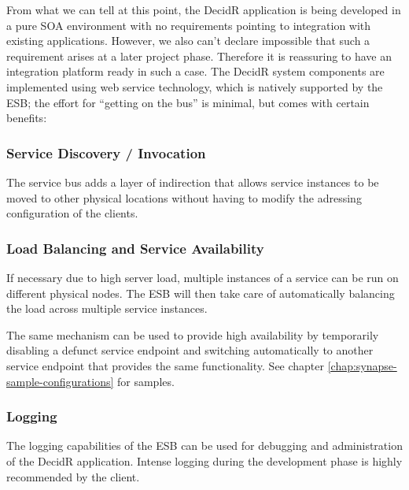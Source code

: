 From what we can tell at this point, the DecidR application is being developed
in a pure SOA environment with no requirements pointing to integration with
existing applications. However, we also can't declare impossible that such a
requirement arises at a later project phase. Therefore it is reassuring
to have an integration platform ready in such a case.
The DecidR system components are implemented using web service technology,
which is natively supported by the ESB; the effort for ``getting on the
bus'' is minimal, but comes with certain benefits:

\subsubsection{Service Discovery / Invocation}
\label{subsec:service-discovery-incovation}

The service bus adds a layer of indirection that allows service instances to be
moved to other physical locations without having to modify the adressing
configuration of the clients.


\newpage
\subsubsection{Load Balancing and Service Availability}
\label{subsec:load-balancing-and-service-availability}
If necessary due to high server load, multiple instances of a service can be
run on different physical nodes. The ESB will then take care of
automatically balancing the load across multiple service instances.

The same mechanism can be used to provide high availability by temporarily
disabling a defunct service endpoint and switching automatically to another
service endpoint that provides the same functionality. See chapter
\ref{chap:synapse-sample-configurations} for samples.

\subsubsection{Logging}
\label{subsec:logging}
The logging capabilities of the ESB can be used for debugging and
administration of the DecidR application. Intense logging during the
development phase is highly recommended by the client.

